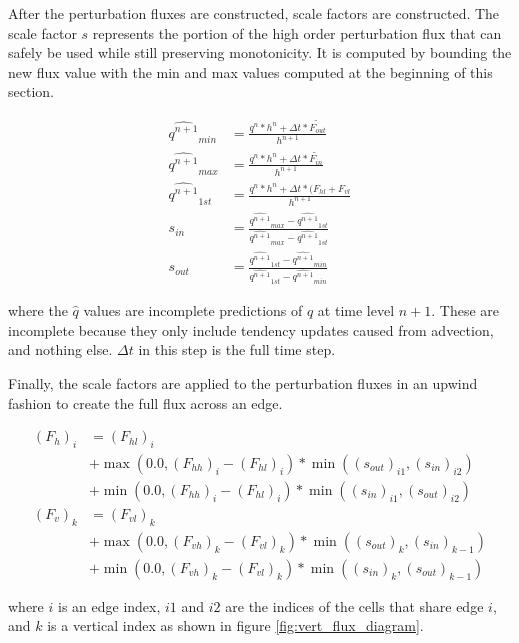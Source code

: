 \documentclass[11pt]{report}
\begin{document}
After the perturbation fluxes are constructed, scale factors are constructed. The scale factor $s$ represents the portion of the high order perturbation flux that can safely be used while still preserving monotonicity. It is computed by bounding the new flux value with the min and max values computed at the beginning of this section.

\begin{align}
	\hat{q^{n+1}}_{min} &= \frac{q^n*h^n + \Delta t * \tilde{F_{out}}}{h^{n+1}} \\
	\hat{q^{n+1}}_{max} &= \frac{q^n*h^n + \Delta t * \tilde{F_{in}}}{h^{n+1}} \\
	\hat{q^{n+1}}_{1st} &= \frac{q^n*h^n + \Delta t * (F_{hl} + F_{vl}}{h^{n+1}} \\
	s_{in} &= \frac{\hat{q^{n+1}}_{max}-\hat{q^{n+1}}_{1st}}{\hat{q^{n+1}}_{max}-\hat{q^{n+1}}_{1st}} \\
	s_{out} &= \frac{\hat{q^{n+1}}_{1st}-\hat{q^{n+1}}_{min}}{\hat{q^{n+1}}_{1st}-\hat{q^{n+1}}_{min}}
\end{align}

where the $\hat{q}$ values are incomplete predictions of $q$ at time level $n+1$. These are incomplete because they only include tendency updates caused from advection, and nothing else. $\Delta t$ in this step is the full time step.

Finally, the scale factors are applied to the perturbation fluxes in an upwind fashion to create the full flux across an edge.

\begin{align*}
	(F_{h})_{i} &= (F_{hl})_{i} \\
	&+ \max(0.0, (F_{hh})_{i} - (F_{hl})_{i}) * \min((s_{out})_{i1}, (s_{in})_{i2}) \\
	&+ \min(0.0, (F_{hh})_{i} - (F_{hl})_{i}) * \min((s_{in})_{i1}, (s_{out})_{i2}) \\
	(F_{v})_{k} &= (F_{vl})_{k} \\
	&+ \max(0.0, (F_{vh})_{k} - (F_{vl})_{k}) * \min((s_{out})_{k}, (s_{in})_{k-1}) \\
	&+ \min(0.0, (F_{vh})_{k} - (F_{vl})_{k}) * \min((s_{in})_{k} , (s_{out})_{k-1})
\end{align*}

where $i$ is an edge index, $i1$ and $i2$ are the indices of the cells that share edge $i$, and $k$ is a vertical index as shown in figure \ref{fig:vert_flux_diagram}.
\end{document}
